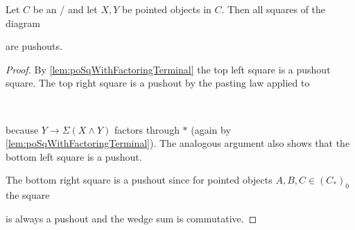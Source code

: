 \begin{lemma}\label{lem:allSqArePo}
    Let $C$ be an \inftytop/ and let $X,Y$ be pointed objects in $C$. 
    Then all squares of the diagram         
    \begin{center}
    \end{center}
    are pushouts.
    \begin{proof}
        By \cref{lem:poSqWithFactoringTerminal} the top left square is a pushout square.
        The top right square is a pushout by the pasting law applied to
        \begin{center}
            \
        \end{center}
        because $Y\to\Sigma\left(X\wedge Y\right)$ factors through $*$ (again by \cref{lem:poSqWithFactoringTerminal}).
        The analogous argument also shows that the bottom left square is a pushout.

        The bottom right square is a pushout since for pointed objects $A,B,C\in \left(C_*\right)_0$ the square
        \begin{center}
        \end{center}
        is always a pushout and the wedge sum is commutative.
    \end{proof}
\end{lemma}
